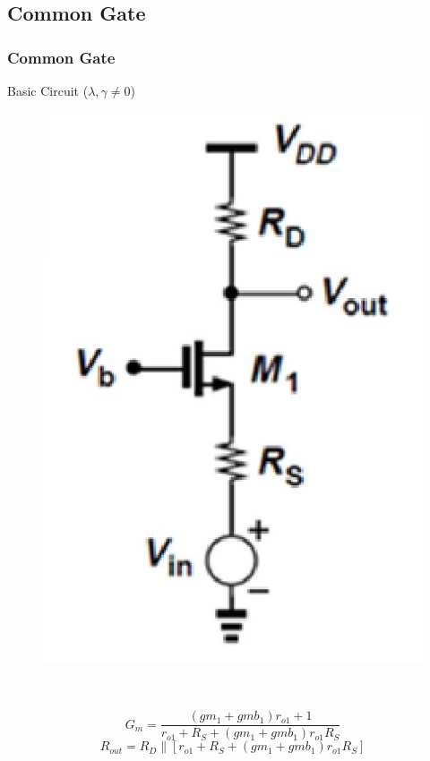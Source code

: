 \documentclass{beamer}
\begin{document}
\subsection{Common Gate}

\begin{frame}
    \frametitle{Common Gate}
    \begin{minipage}{0.4\linewidth}
        Basic Circuit ($\lambda, \gamma\not= 0$)
        \begin{figure}[H]
            \centering
            \includegraphics[width=0.8\linewidth]{common-gate.png}
        \end{figure}
    \end{minipage}
    \,
    \begin{minipage}{0.55\linewidth}
        \begin{equation*}
            {G}_{{m}}=\frac{({gm_1}+{gmb_1}) {r}_{{o1}}+1}{{r}_{{o1}}+{R}_{{S}}+({gm_1}+{gmb_1}) {r}_{{o1}} {R}_{{S}}}
        \end{equation*}
        \begin{equation*}
            R_{{out }}=R_{D} \|\left[r_{o1}+R_{S}+(g m_1+g m b_1) r_{o1} R_{S}\right]
        \end{equation*}

\end{minipage}
\end{frame}
\end{document}
